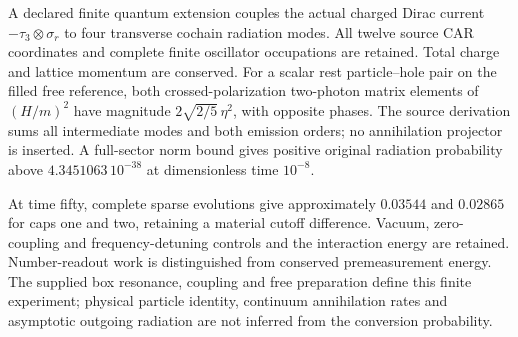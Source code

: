 A declared finite quantum extension couples the actual charged Dirac current
$-\tau_3\otimes\sigma_r$ to four transverse cochain radiation modes.
All twelve source CAR coordinates and complete finite oscillator occupations
are retained. Total charge and lattice momentum are conserved. For a scalar
rest particle--hole pair on the filled free reference, both crossed-polarization
two-photon matrix elements of $(H/m)^2$ have magnitude
$2\sqrt{2/5}\,\eta^2$, with opposite phases. The source derivation sums
all intermediate modes and both emission orders; no annihilation projector
is inserted. A full-sector norm bound gives positive original radiation
probability above $4.3451063\,10^{-38}$ at dimensionless time $10^{-8}$.

At time fifty, complete sparse evolutions give approximately $0.03544$
and $0.02865$ for caps one and two, retaining a material cutoff difference.
Vacuum, zero-coupling and frequency-detuning controls and the interaction
energy are retained. Number-readout work is distinguished from conserved
premeasurement energy. The supplied box resonance, coupling and free
preparation define this finite experiment; physical particle identity,
continuum annihilation rates and asymptotic outgoing radiation are not
inferred from the conversion probability.
